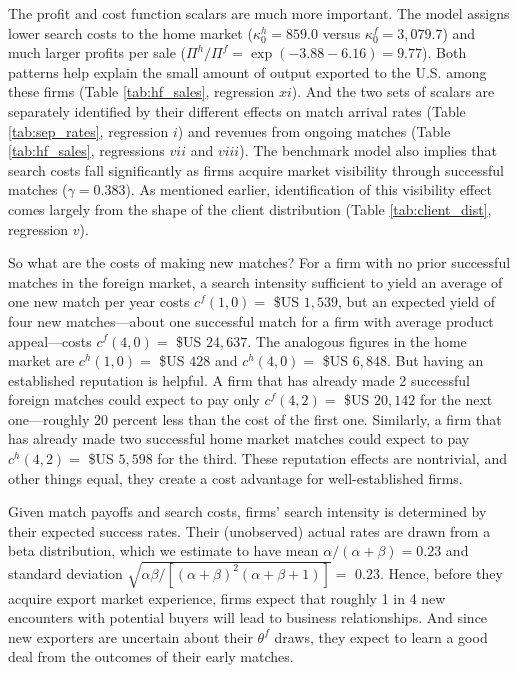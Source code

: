 \documentclass[12pt]{article}
\begin{document}
The profit and cost function scalars are much more important. The model
assigns lower search costs to the home market ($\kappa _{0}^{h}=859.0$
versus $\kappa _{0}^{f}=3,079.7$) and much larger profits per sale ($\Pi
^{h}/\Pi ^{f}=\exp \left( -3.88-6.16\right) =9.77$). Both patterns help
explain the small amount of output exported to the U.S. among these firms
(Table \ref{tab:hf_sales}, regression $xi$). And the two sets of scalars are
separately identified by their different effects on match arrival rates
(Table \ref{tab:sep_rates}, regression $i$) and revenues from ongoing
matches (Table \ref{tab:hf_sales}, regressions $vii$ and $viii$). The
benchmark model also implies that search costs fall significantly as firms
acquire market visibility through successful matches ($\gamma =0.383$). As
mentioned earlier, identification of this visibility effect comes largely
from the shape of the client distribution (Table \ref{tab:client_dist},
regression $v$).

So what are the costs of making new matches? For a firm with no prior
successful matches in the foreign market, a search intensity sufficient to
yield an average of one new match per year costs $c^{f}(1,0)=$ \$US $1,539$, but an expected yield of four new matches---about one successful
match for a firm with average product appeal---costs $c^{f}(4,0)=$ \$US $%
24,637$. The analogous figures in the home market are $c^{h}(1,0)=$ \$US $%
428 $ and $c^{h}(4,0)=$ \$US $6,848$. But having an established reputation
is helpful. A firm that has already made 2 successful foreign matches could
expect to pay only $c^{f}(4,2)=$ \$US $20,142$ for the next
one---roughly 20 percent less than the cost of the first one. Similarly, a
firm that has already made two successful home market matches could expect
to pay $c^{h}(4,2)=$ \$US $5,598$ for the third. These reputation effects
are nontrivial, and other things equal, they create a cost advantage for
well-established firms.

Given match payoffs and search costs, firms' search intensity is determined
by their expected success rates. Their (unobserved) actual rates are drawn
from a beta distribution, which we estimate to have mean $\alpha /(\alpha
+\beta )=0.23$ and standard deviation $\sqrt{\alpha \beta /\left[ (\alpha
+\beta )^{2}(\alpha +\beta +1)\right] }=$ $0.23$. Hence, before they acquire
export market experience, firms expect that roughly 1 in 4 new encounters
with potential buyers will lead to business relationships. And since new
exporters are uncertain about their $\theta ^{f}$ draws, they expect to
learn a good deal from the outcomes of their early matches.\ 
\end{document}
